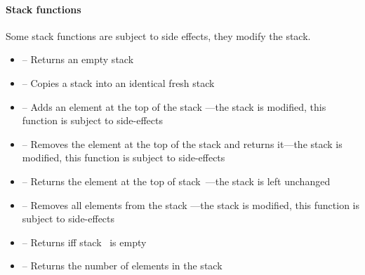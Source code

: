 \paragraph{Stack functions}

Some stack functions are subject to side effects, \ie{} they modify the stack.

\begin{itemize}
	\item {} -- Returns an empty stack

	\item \label{item:lbl-stack_copy}  -- Copies a stack  into an identical fresh stack

	\item \label{item:lbl-stack_push}  -- Adds an element  at the top of the stack ---the stack is modified, this function is subject to side-effects

	\item \label{item:lbl-stack_pop}  -- Removes the element at the top of the stack  and returns it---the stack is modified, this function is subject to side-effects

	\item \label{item:lbl-stack_top}  -- Returns the element at the top of stack~---the stack is left unchanged

	\item \label{item:lbl-stack_clear}  -- Removes all elements from the stack ---the stack is modified, this function is subject to side-effects

	\item \label{item:lbl-stack_is_empty}  -- Returns  iff stack~ is empty

	\item \label{item:lbl-stack_length}  -- Returns the number of elements in the stack 
\end{itemize}

